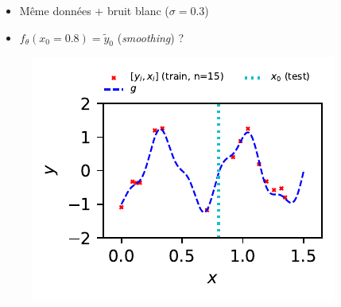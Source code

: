 \documentclass[xcolor=svgnames, t]{beamer}
\newcommand{\coloredemph}[1]{\textcolor{internationalblue}{\emph{#1}}}
\begin{document}
\begin{frame}{\subsecname}
  \begin{itemize}
    \item Même données + bruit blanc ($\sigma = 0.3$)
    \item $f_\theta(x_0 = 0.8) = \tilde{y}_0$ (\coloredemph{smoothing}) ?
  \end{itemize}
  \begin{figure}
    \includegraphics{gp_1D_example_noisy_data.pdf}
  \end{figure}
\end{frame}
\end{document}
